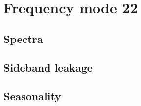 \section{Frequency mode 22}
\subsection{Spectra}

\subsection{Sideband leakage}

\subsection{Seasonality}

